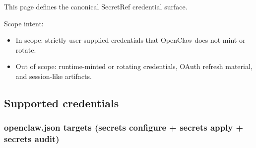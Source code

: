 This page defines the canonical SecretRef credential surface.

Scope intent:

\begin{itemize}
  \item In scope: strictly user-supplied credentials that OpenClaw does not mint or rotate.
  \item Out of scope: runtime-minted or rotating credentials, OAuth refresh material, and session-like artifacts.
\end{itemize}


\subsection{Supported credentials}


\subsubsection{openclaw.json targets (secrets configure + secrets apply + secrets audit)}



